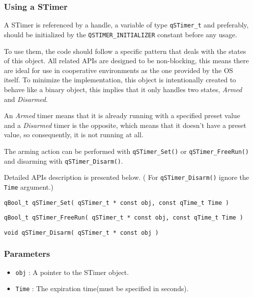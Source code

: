 \subsubsection{Using a STimer}
A STimer is referenced by a handle, a variable of type \lstinline{qSTimer_t}  and preferably, should be initialized by the \lstinline{QSTIMER_INITIALIZER} constant before any usage. 

To use them, the code should follow a specific pattern that deals with the states of this object. All related APIs are designed to be non-blocking, this means there are ideal for use in cooperative environments as the one provided by the OS itself. To minimize the implementation, this object is intentionally created to behave like a binary object, this implies that it only handles two states, \textit{Armed} and \textit{Disarmed}. 
\medskip

An \textit{Armed} timer means that it is already running with a specified preset value and a \textit{Disarmed} timer is the opposite, which means that it doesn't have a preset value, so consequently, it is not running at all.

The arming action can be performed with \lstinline{qSTimer_Set()}  or \lstinline{qSTimer_FreeRun()}  and disarming with \lstinline{qSTimer_Disarm()}. 
\medskip

Detailed APIs description is presented below. ( For \lstinline{qSTimer_Disarm()} ignore the \lstinline{Time} argument.)
\medskip

\begin{lstlisting}[style=CStyle]
qBool_t qSTimer_Set( qSTimer_t * const obj, const qTime_t Time )
\end{lstlisting}

\begin{lstlisting}[style=CStyle]
qBool_t qSTimer_FreeRun( qSTimer_t * const obj, const qTime_t Time )
\end{lstlisting}

\begin{lstlisting}[style=CStyle]
void qSTimer_Disarm( qSTimer_t * const obj )
\end{lstlisting}

\subsubsection*{Parameters}
\begin{itemize}
    \item \lstinline{obj} : A pointer to the STimer object. 
    \item \lstinline{Time} : The expiration time(must be specified in seconds).
\end{itemize}

